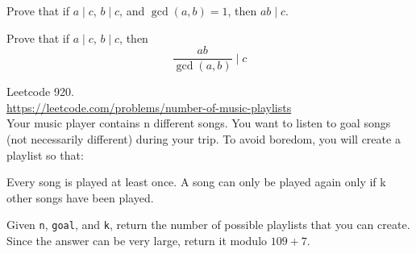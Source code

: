 \begin{ex}
  Prove that if $a \mid c$, $b \mid c$, and $\gcd(a,b) = 1$, then
  $ab \mid c$.
\end{ex}

\begin{ex}
  Prove that if $a \mid c$, $b \mid c$, then
  \[
  \frac{ab}{\gcd(a,b)} \mid c
  \]
\end{ex}


\begin{ex}
  Leetcode 920.\\
  \url{https://leetcode.com/problems/number-of-music-playlists}\\
  Your music player contains n different songs.
  You want to listen to goal songs (not necessarily different) during your trip.
  To avoid boredom, you will create a playlist so that:
  \begin{enumerate}[nosep]
    \li Every song is played at least once.
    \li A song can only be played again only if k other songs have been played.
  \end{enumerate}
  Given \verb!n!, \verb!goal!, and \verb!k!,
  return the number of possible playlists that you can create.
  Since the answer can be very large, return it modulo $109 + 7$.
\end{ex}
